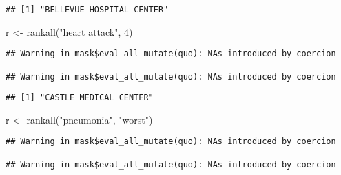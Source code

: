 \documentclass[
]{article}
\newenvironment{Shaded}{\begin{snugshade}}{\end{snugshade}}
\newcommand{\DecValTok}[1]{\textcolor[rgb]{0.00,0.00,0.81}{#1}}
\newcommand{\FunctionTok}[1]{\textcolor[rgb]{0.00,0.00,0.00}{#1}}
\newcommand{\NormalTok}[1]{#1}
\newcommand{\OtherTok}[1]{\textcolor[rgb]{0.56,0.35,0.01}{#1}}
\newcommand{\SpecialCharTok}[1]{\textcolor[rgb]{0.00,0.00,0.00}{#1}}
\newcommand{\StringTok}[1]{\textcolor[rgb]{0.31,0.60,0.02}{#1}}
\begin{document}
\begin{verbatim}
## [1] "BELLEVUE HOSPITAL CENTER"
\end{verbatim}

\begin{Shaded}
\begin{Highlighting}[]
\NormalTok{r }\OtherTok{\textless{}{-}} \FunctionTok{rankall}\NormalTok{(}\StringTok{"heart attack"}\NormalTok{, }\DecValTok{4}\NormalTok{)}
\end{Highlighting}
\end{Shaded}

\begin{verbatim}
## Warning in mask$eval_all_mutate(quo): NAs introduced by coercion

## Warning in mask$eval_all_mutate(quo): NAs introduced by coercion
\end{verbatim}

\begin{Shaded}
\end{Shaded}

\begin{verbatim}
## [1] "CASTLE MEDICAL CENTER"
\end{verbatim}

\begin{Shaded}
\begin{Highlighting}[]
\NormalTok{r }\OtherTok{\textless{}{-}} \FunctionTok{rankall}\NormalTok{(}\StringTok{"pneumonia"}\NormalTok{, }\StringTok{"worst"}\NormalTok{)}
\end{Highlighting}
\end{Shaded}

\begin{verbatim}
## Warning in mask$eval_all_mutate(quo): NAs introduced by coercion

## Warning in mask$eval_all_mutate(quo): NAs introduced by coercion
\end{verbatim}

\begin{Shaded}
\end{Shaded}
\end{document}
